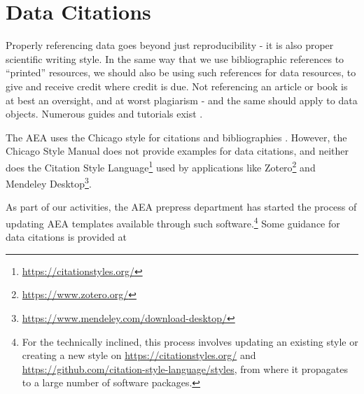 \documentclass[AEJ]{AEA}
\begin{document}
\section{Data Citations}
Properly referencing data goes beyond just reproducibility - it is also proper scientific writing style. In the same way that we use bibliographic references to ``printed'' resources, we should also be using such references for data resources, to give and receive credit where credit is due. Not referencing an article or book is at best an oversight, and at worst plagiarism - and the same should apply to data objects. Numerous guides and tutorials exist  \citep{dataone-l09,icpsr-data-cite,force11declaration}.

The AEA uses the Chicago style for citations and bibliographies \citep{aeadatarefs}. However, the Chicago Style Manual \citep{citation-machine,ChicagoManualofStyleChicagoManualStyle2018} does not provide examples for data citations, and neither does the Citation Style Language\footnote{\url{https://citationstyles.org/}} used by applications like Zotero\footnote{\url{https://www.zotero.org/}} and Mendeley Desktop\footnote{\url{https://www.mendeley.com/download-desktop/}}.


As part of our activities, the AEA prepress department has started the process of updating AEA templates available through such software.\footnote{For the technically inclined, this process involves updating an existing style or creating a new style on \url{https://citationstyles.org/} and \url{https://github.com/citation-style-language/styles}, from where it propagates to a large number of software packages.} Some guidance for data citations is provided at 
\end{document}
